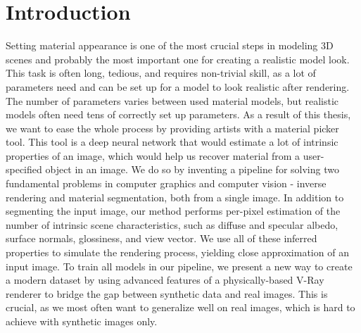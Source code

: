 \chapter*{Introduction} %

Setting material appearance is one of the most crucial steps in modeling 3D scenes and probably the most important one for creating a realistic model look. This task is often long, tedious, and requires non-trivial skill, as a lot of parameters need and can be set up for a model to look realistic after rendering. The number of parameters varies between used material models, but realistic models often need tens of correctly set up parameters.
\newline
As a result of this thesis, we want to ease the whole process by providing artists with a material picker tool. This tool is a deep neural network that would estimate a lot of intrinsic properties of an image, which would help us recover material from a user-specified object in an image.
\newline
We do so by inventing a pipeline for solving two fundamental problems in computer graphics and computer vision - inverse rendering and material segmentation, both from a single image. In addition to segmenting the input image, our method performs per-pixel estimation of the number of intrinsic scene characteristics, such as diffuse and specular albedo, surface normals, glossiness, and view vector. We use all of these inferred properties to simulate the rendering process, yielding close approximation of an input image.
\newline
To train all models in our pipeline, we present a new way to create a modern dataset by using advanced features of a physically-based V-Ray renderer to bridge the gap between synthetic data and real images. This is crucial, as we most often want to generalize well on real images, which is hard to achieve with synthetic images only.